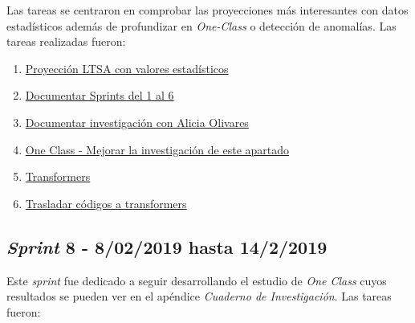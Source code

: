 Las tareas se centraron en comprobar las proyecciones más interesantes con datos estadísticos además de profundizar en \textit{One-Class} o detección de anomalías. Las tareas realizadas fueron:
\begin{enumerate}\addtocounter{enumi}{21}
	\item \href{https://github.com/joselucross/TFG-SmartBeds/issues/22}{Proyección LTSA con valores estadísticos}~\cite{zhang2004principal}
	\item 
	\href{https://github.com/joselucross/TFG-SmartBeds/issues/23}{Documentar Sprints del 1 al 6}
	\item
	\href{https://github.com/joselucross/TFG-SmartBeds/issues/24}{Documentar investigación con Alicia Olivares}
	\item
	\href{https://github.com/joselucross/TFG-SmartBeds/issues/25}{One Class - Mejorar la investigación de este apartado}
	\item
	\href{https://github.com/joselucross/TFG-SmartBeds/issues/26}{Transformers}
	\item
	\href{https://github.com/joselucross/TFG-SmartBeds/issues/27}{Trasladar códigos a transformers}
\end{enumerate}

\subsection{\textit{Sprint} 8 - 8/02/2019 hasta 14/2/2019}
Este \textit{sprint} fue dedicado a seguir desarrollando el estudio de \textit{One Class} cuyos resultados se pueden ver en el apéndice \textit{Cuaderno de Investigación}. Las tareas fueron:

